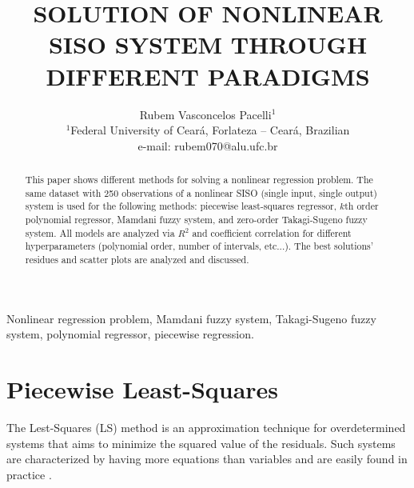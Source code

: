 \documentclass[english]{sobraep}
\title{SOLUTION OF NONLINEAR SISO SYSTEM THROUGH DIFFERENT PARADIGMS}
\author{Rubem Vasconcelos Pacelli$^{1}$\\
	\normalsize $^{1}$Federal University of Ceará, Forlateza -- Ceará, Brazilian\\
	\normalsize e-mail: rubem070@alu.ufc.br
}
\begin{document}
\maketitle

\begin{abstract}
	This paper shows different methods for solving a nonlinear regression problem. The same dataset with 250 observations of a nonlinear SISO (single input, single output) system is used for the following methods: piecewise least-squares regressor, $k$th order polynomial regressor, Mamdani fuzzy system, and zero-order Takagi-Sugeno fuzzy system. All models are analyzed via $R^2$ and coefficient correlation for different hyperparameters (polynomial order, number of intervals, etc...). The best solutions' residues and scatter plots are analyzed and discussed.
\end{abstract}

\begin{keywords}
	Nonlinear regression problem, Mamdani fuzzy system, Takagi-Sugeno fuzzy system, polynomial regressor, piecewise regression. 
\end{keywords}






\section{Piecewise Least-Squares}

The Lest-Squares (LS) method is an approximation technique for overdetermined systems that aims to minimize the squared value of the residuals. Such systems are characterized by having more equations than variables and are easily found in practice \cite{kay1993fundamentals}.
\end{document}
